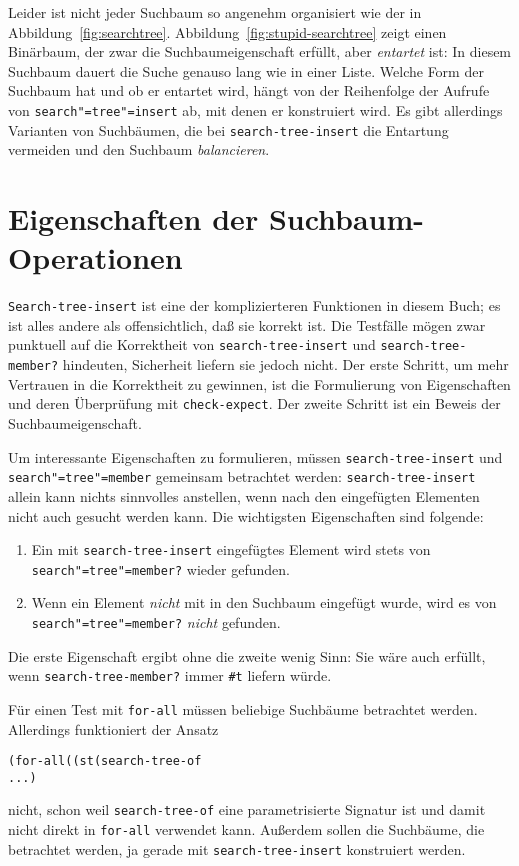 Leider ist nicht jeder Suchbaum so angenehm organisiert wie der in
Abbildung~\ref{fig:searchtree}.  Abbildung~\ref{fig:stupid-searchtree}
zeigt einen Binärbaum, der zwar die Suchbaumeigenschaft erfüllt, aber
\textit{entartet}
ist:\label{label:entartet}
In diesem Suchbaum dauert die Suche genauso
lang wie in einer Liste.  Welche Form der Suchbaum hat und ob er
entartet wird, hängt von der
Reihenfolge der Aufrufe von \texttt{search"=tree"=insert}
ab, mit denen er konstruiert wird.  Es gibt allerdings Varianten von Suchbäumen, die bei
  \texttt{search-tree-insert} die Entartung vermeiden und den
  Suchbaum \textit{balancieren}.


\section{Eigenschaften der Suchbaum-Operationen}

\texttt{Search-tree-insert} ist eine der komplizierteren Funktionen in
diesem Buch; es ist alles andere als offensichtlich, daß sie korrekt
ist.  Die Testfälle mögen zwar punktuell auf die Korrektheit von
\texttt{search-tree-insert} und \texttt{search-tree-member?}
hindeuten, Sicherheit liefern sie jedoch nicht.  Der erste Schritt, um
mehr Vertrauen in die Korrektheit zu gewinnen, ist die Formulierung
von Eigenschaften und deren Überprüfung mit \texttt{check-expect}.
Der zweite Schritt ist ein Beweis der Suchbaumeigenschaft.

Um interessante Eigenschaften zu formulieren, müssen
\texttt{search-tree-insert} und \texttt{search"=tree"=member} gemeinsam
betrachtet werden: \texttt{search-tree-insert} allein kann nichts
sinnvolles anstellen, wenn nach den eingefügten Elementen nicht auch
gesucht werden kann.  Die wichtigsten Eigenschaften sind folgende:
%
\begin{enumerate}
\item Ein mit \texttt{search-tree-insert} eingefügtes Element wird
  stets von \texttt{search"=tree"=member?} wieder gefunden.
\item Wenn ein Element \emph{nicht} mit in den Suchbaum eingefügt
  wurde, wird es von \texttt{search"=tree"=member?} \emph{nicht}
  gefunden.
\end{enumerate}
%
Die erste Eigenschaft ergibt ohne die zweite wenig Sinn: Sie wäre auch
erfüllt, wenn \texttt{search-tree-member?} immer \verb|#t| liefern
würde.

Für einen Test mit \texttt{for-all} müssen beliebige Suchbäume
betrachtet werden.  Allerdings funktioniert der Ansatz
%
\begin{alltt}
(for-all ((st (search-tree-of %a)))
  ...)
\end{alltt}
%
nicht, schon weil \texttt{search-tree-of} eine  parametrisierte Signatur ist und
damit nicht direkt in \texttt{for-all} verwendet kann.  Außerdem
sollen die Suchbäume, die betrachtet werden, ja gerade mit
\texttt{search-tree-insert} konstruiert werden.  

